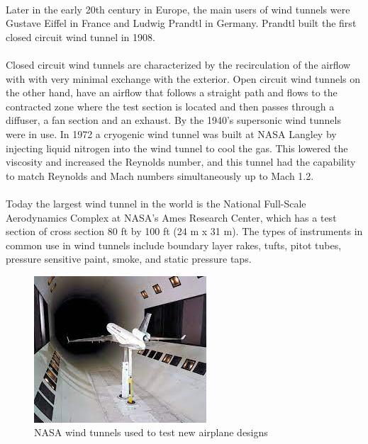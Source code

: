 \paragraph{}
Later in the early 20th century in Europe, the main users of wind tunnels were Gustave Eiffel in France and Ludwig Prandtl in Germany. Prandtl built the first closed circuit wind tunnel in 1908.
\paragraph{}Closed circuit wind tunnels are characterized by the recirculation of the airflow with with very minimal exchange with the exterior. Open circuit wind tunnels on the other hand, have an airflow that follows a straight path and flows to the contracted zone where the test section is located and then passes through a diffuser, a fan section
and an exhaust.
\cite{fernandes_design_nodate}
By the 1940’s supersonic wind tunnels were in use. In 1972 a cryogenic wind tunnel was built at NASA Langley by injecting liquid nitrogen into the wind tunnel to cool the gas. This lowered the viscosity and increased the Reynolds number, and this tunnel had the capability to match Reynolds and Mach numbers simultaneously up to Mach 1.2. 
\paragraph{}Today the largest wind tunnel in the world is the National Full-Scale Aerodynamics Complex at NASA's Ames Research Center, which has a test section of cross section 80 ft by 100 ft (24 m x 31 m). The types of instruments in common use in wind tunnels include boundary layer rakes, tufts, pitot tubes, pressure sensitive paint, smoke, and static pressure taps.
\begin{center}
\begin{figure}[!h]
	\centering
	\includegraphics{Figures/Fig3}
	\caption{NASA wind tunnels used to test new airplane designs}
\end{figure}
\end{center}

